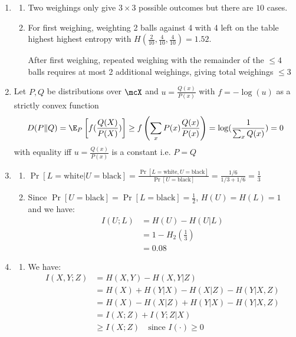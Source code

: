 \documentclass[12pt, a4paper]{article}
\begin{document}
\begin{enumerate}[Q\arabic*.]
  \item 
    \begin{enumerate}[\roman*.]
      \item Two weighings only give $3\times 3$ possible outcomes but there are $10$ cases.

      \item For first weighing, weighting 2 balls against 4 with 4 left on the table highest highest entropy with $H(\frac{2}{10}, \frac{4}{10}, \frac{4}{10}) = 1.52$.

        After first weighing, repeated weighing with the remainder of the $\leq 4$ balls requires at most 2 additional weighings, giving total weighings $\leq 3$
    \end{enumerate}

  \item Let $P,Q$ be distributions over $\mcX$ and $u = \frac{Q(x)}{P(x)}$ with $f=-\log(u)$ as a strictly convex function
    \begin{align*}
      D(P\|Q) = \E_{P}\left[f(\frac{Q(X)}{P(X)})\right] \geq f\left(\sum_x P(x) \frac{Q(x)}{P(x)}\right) = \log(\frac{1}{\sum_x Q(x)}) = 0
    \end{align*}
    with equality iff $u=\frac{Q(x)}{P(x)}$ is a constant i.e. $P=Q$

  \item 
    \begin{enumerate}
      \item $\displaystyle \Pr[L=\text{white}|U=\text{black}] = \frac{\Pr[L=\text{white}, U=\text{black}]}{\Pr[U=\text{black}]} = \frac{1 /6}{1 /3 + 1 /6} = \frac{1}{3}$

      \item Since $\displaystyle \Pr[U=\text{black}] = \Pr[L=\text{black}] = \frac{1}{2}$, $H(U) = H(L) = 1$\\ and we have:
        \begin{align*}
          I(U;L) &= H(U) - H(U|L)\\ 
                 &= 1 - H_2(\frac{1}{3})\\ 
                 &= 0.08
        \end{align*}
    \end{enumerate}

  \item 
    \begin{enumerate}
      \item We have:
        \begin{align*}
          I(X,Y;Z) &= H(X,Y) - H(X,Y|Z)\\ 
                   &= H(X) + H(Y|X) - H(X|Z) - H(Y|X,Z)\\ 
                   &= H(X) - H(X|Z) + H(Y|X) - H(Y|X,Z)\\ 
                   &= I(X;Z) + I(Y;Z|X)\\ 
                   &\geq I(X;Z)\quad\text{since $I(\cdot) \geq 0$}
        \end{align*}


\end{enumerate}
\end{enumerate}
\end{document}
